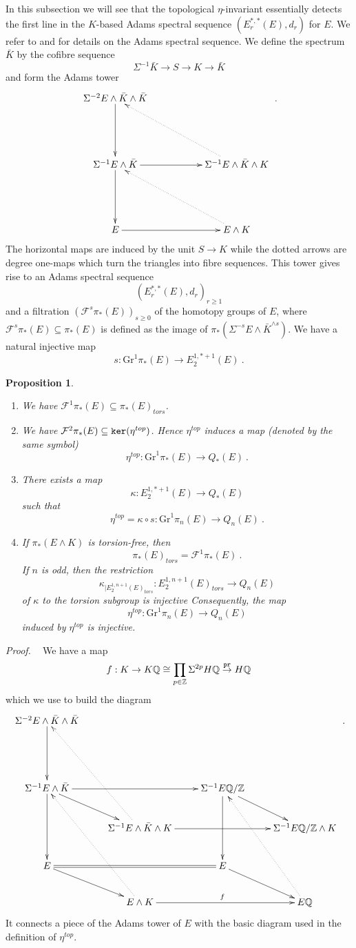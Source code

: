 \documentclass[12pt]{article}
\newtheorem{prop}[theorem]{Proposition}
\newcommand{\cF}{\mathcal{F}}
\newcommand{\Gr}{\mathrm{Gr}}
\renewcommand{\ker}{{\tt ker}}
\newcommand{\proof}{{\it Proof.$\:\:\:\:$}}
\newcommand{\Z}{{\mathbb{Z}}}
\newcommand{\Q}{{\mathbb{Q}}}
\newcommand{\pr}{{\tt pr}}
\begin{document}
In this subsection we will see that the topological $\eta$-invariant essentially detects the first line in the 
$K$-based Adams spectral sequence $(E^{*,*}_{r}(E),d_{r})$  for $E$. We refer 
 to \cite{MR1324104} and \cite{MR860042} for details on the Adams spectral sequence.   We define  the spectrum $\bar K$ by the cofibre sequence
$$\Sigma^{-1}\bar K\to S\to K\to \bar K$$
 and form the Adams tower
$$\xymatrix{\Sigma^{-2}E\wedge \bar K\wedge \bar K\ar[dd]&&\\&&\\\Sigma^{-1}E\wedge \bar K\ar[dd]\ar[rr]&&\Sigma^{-1}E\wedge \bar K\wedge K\ar@{..>}[uull]\\&&\\E\ar[rr]&&E\wedge K\ar@{..>}[uull]}\ .$$
The horizontal maps are induced by the unit $S\to K$ while the dotted arrows are degree one-maps which turn the triangles into fibre sequences.
This tower gives rise to an Adams spectral sequence
$$(E_{r}^{*,*}(E),d_{r})_{r\ge 1}$$
 and a filtration $(\cF^{s}\pi_{*}(E))_{s\ge 0}$ of the homotopy groups of $E$, where
  $\cF^{s}\pi_{*}(E)\subseteq \pi_{*}(E)$ is defined as  the image of $\pi_{*}(\Sigma^{-s}E\wedge \bar K^{\wedge s})$.
 We have a natural injective map
 $$s:\Gr^{1}\pi_{*}(E)\to E_{2}^{1,*+1}(E)\ .$$
 
 \begin{prop}\label{prop1}
 \begin{enumerate}
\item We have $\cF^{1}\pi_{*}(E)\subseteq \pi_{*}(E)_{tors}$.
 \item 
 We have $\cF^{2}\pi_{*}(E)\subseteq \ker(\eta^{top})$. Hence $\eta^{top}$ induces a map (denoted by the same symbol)
 $$\eta^{top}:\Gr^{1}\pi_{*}(E)\to Q_{*}(E)\ .$$ 
 \item There exists a map
$$\kappa: E_{2}^{1,*+1}(E)\to Q_{*}(E)$$
such that
$$\eta^{top}=\kappa\circ s:\Gr^{1}\pi_{n}(E)\to Q_{n}(E)\ .$$
\item 
If $\pi_{*}(E\wedge K )$ is torsion-free, then $$\pi_{*}(E)_{tors}= \cF^{1}\pi_{*}(E)\ .$$ If $n$ is odd, then the restriction $$\kappa_{|E_{2}^{1,n+1}(E)_{tors}}:E_{2}^{1,n+1}(E)_{tors}\to Q_{n}(E)$$ of $\kappa$ to the torsion subgroup is injective
Consequently, the map
 $$\eta^{top}:\Gr^{1}\pi_{n}(E)\to Q_{n}(E)$$ induced by $\eta^{top}$ is injective.
\end{enumerate}
 \end{prop}
\proof
We have a map
$$f:K\to K\Q\cong \prod_{p\in \Z} \Sigma^{2p}H\Q\stackrel{\pr}{\to} H\Q$$
which we use to build the diagram
$$\xymatrix{\Sigma^{-2} E\wedge \bar K\wedge \bar K\ar[dd]&& \\&&&\\\Sigma^{-1} E\wedge \bar K\ar[rr]\ar[dd] \ar[dr]&&\Sigma^{-1}E\Q/\Z\ar[dd]\ar[dr]&\\ &\Sigma^{-1}E\wedge \bar K\wedge K\ar[rr]\ar@{..>}[uuul]&&\Sigma^{-1}E\Q/\Z\wedge K\\E\ar@{=}[rr]\ar[rd]&&E\ar[dr]&\\
&E\wedge K\ar@{..>}[uuul]\ar[rr]^{f}&&E\Q\ar@{..>}[uuul]}\ .$$
It connects a piece of the Adams tower of $E$ with the basic diagram used in the definition of $\eta^{top}$. 
\end{document}
